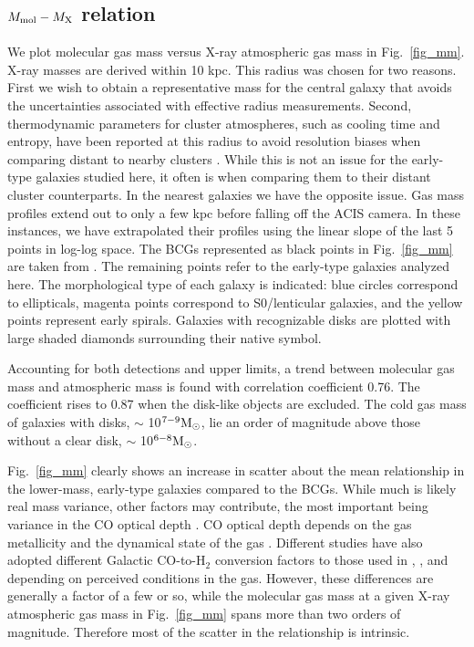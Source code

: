 \documentclass[iop]{emulateapj}
\begin{document}
\subsection{$M_{\rm mol}-M_{\rm X}$ relation}
We plot molecular gas mass versus X-ray atmospheric gas mass in Fig.~\ref{fig_mm}.  X-ray masses are derived within 10 kpc. This radius was chosen for two reasons. First we wish to obtain a representative mass for the central galaxy that avoids the uncertainties associated with effective radius measurements.  Second, thermodynamic parameters for cluster atmospheres, such as cooling time and entropy, have been reported at this radius to avoid resolution biases when comparing distant to nearby clusters \citep{Rafferty:08}. While this is not an issue for the early-type galaxies studied here, it often is when comparing them to their distant cluster counterparts. In the nearest galaxies we have the opposite issue. Gas mass profiles extend out to only a few kpc before falling off the ACIS camera. In these instances, we have extrapolated their profiles using the linear slope of the last 5 points in log-log space. The BCGs represented as black points in Fig.~\ref{fig_mm} are taken from \citet{Pulido:17}. The remaining points refer to the early-type galaxies analyzed here. The morphological type of each galaxy is indicated: blue circles correspond to ellipticals, magenta points correspond to S0/lenticular galaxies, and the yellow points represent early spirals. Galaxies with recognizable disks are plotted with large shaded diamonds surrounding their native symbol.

Accounting for both detections and upper limits, a trend between molecular gas mass and atmospheric mass is found with correlation coefficient 0.76. The coefficient rises to 0.87 when  the disk-like objects are excluded. The cold gas mass of galaxies with disks, $\sim$ 10$^{7-9}\rm M_{\odot}$, lie an order of magnitude above those without a clear disk, $\sim$ 10$^{6-8}\rm M_{\odot}$. 

Fig.~\ref{fig_mm} clearly shows an increase in scatter about the mean relationship in the lower-mass, early-type galaxies compared to the BCGs.  While much is likely real mass variance, other factors may contribute, the most important being variance in the CO optical depth \citep{Crocker:12}. CO optical depth depends on the gas metallicity and the dynamical state of the gas \citep{Alatalo:13}. Different studies have also adopted different Galactic CO-to-H$_2$ conversion factors to those used in \citet{Pulido:17}, \citet{Boz}, and \citet{Young:11} depending on perceived conditions in the gas. However, these differences are generally a factor of a few or so, while the molecular gas mass at a given X-ray atmospheric gas mass in Fig.~\ref{fig_mm} spans more than two orders of magnitude. Therefore most of the scatter in the relationship is intrinsic.
\end{document}
